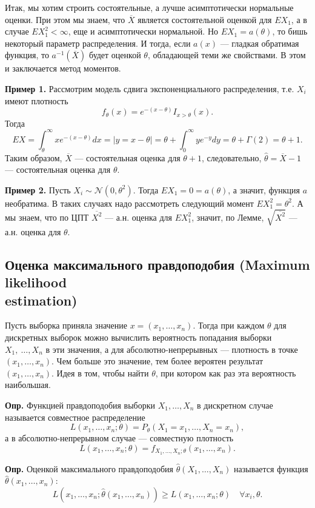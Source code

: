 \documentclass[a4paper,12pt]{article}
\newcommand{\thetah}{\hat\theta}
\newcommand{\bX}{\overline X}
\renewcommand{\ge}{\geqslant}
\newcounter{th-counter}
\newcounter{df-counter}
\newcommand{\df}{\par\noindent%
	\textbf{Опр. } }
\begin{document}
Итак, мы хотим строить состоятельные, а лучше асимптотически нормальные оценки. При этом мы знаем, что $\bX$ является состоятельной оценкой для $EX_1$, а в случае $EX_1^2 < \infty$, еще и асимптотически нормальной. Но $EX_1 = a(\theta)$, то бишь некоторый параметр распределения. И тогда, если $a(x)$ --- гладкая обратимая функция, то $a^{-1}(\bX)$ будет оценкой $\theta$, обладающей теми же свойствами. В этом и заключается метод моментов.

\textbf{Пример 1.} Рассмотрим модель сдвига экспоненциального распределения, т.е. $X_i$ имеют плотность
$$f_\theta(x) = e^{-(x-\theta)}I_{x > \theta}(x).$$
Тогда 
$$EX = \int_\theta^\infty xe^{-(x-\theta)} dx = |y = x-\theta| = \theta + \int_0^\infty ye^{-y} dy = \theta + \Gamma(2) = \theta  + 1.$$
Таким образом, $\bX$ --- состоятельная оценка для $\theta + 1$, следовательно, $\thetah = \bX - 1$ --- состоятельная оценка для $\theta$.

\textbf{Пример 2.} Пусть $X_i \sim \mathcal{N}(0, \theta^2)$. Тогда $EX_1 = 0 = a(\theta)$, а значит, функция $a$ необратима. В таких случаях надо рассмотреть следующий момент $EX_1^2 = \theta^2$. А мы знаем, что по ЦПТ $\overline{X^2}$ --- а.н. оценка для $EX_1^2$, значит, по Лемме, $\sqrt{\overline{X^2}}$ --- а.н. оценка для $\theta$.

\subsection*{Оценка максимального правдоподобия (Maximum likelihood\\ estimation)} 
Пусть выборка приняла значение $x = (x_1, \ldots, x_n)$. Тогда при каждом $\theta$ для дискретных выборок можно вычислить вероятность попадания выборки $X_1, \ \ldots, X_n$ в эти значения, а для абсолютно-непрерывных --- плотность в точке $(x_1, \ldots, x_n)$. Чем больше это значение, тем более вероятен результат $(x_1, \ldots, x_n)$. Идея в том, чтобы найти $\theta$, при котором как раз эта вероятность наибольшая.

\df Функцией правдоподобия выборки $X_1, \ldots, X_n$ в дискретном случае называется совместное распределение
$$L(x_1, \ldots, x_n; \theta) = P_\theta(X_1 = x_1, \ldots, X_n = x_n),$$
а в абсолютно-непрерывном случае --- совместную плотность
$$L(x_1, \ldots, x_n; \theta) = f_{X_1, \ldots, X_n; \theta} (x_1, \ldots, x_n).$$

\df Оценкой максимального правдоподобия $\thetah(X_1, \ldots, X_n)$ называется функция $\thetah(x_1, \ldots, x_n)$:
$$L(x_1, \ldots, x_n; \thetah(x_1, \ldots, x_n)) \ge L(x_1, \ldots, x_n; \theta) \quad \forall x_i, \theta.$$
\end{document}
